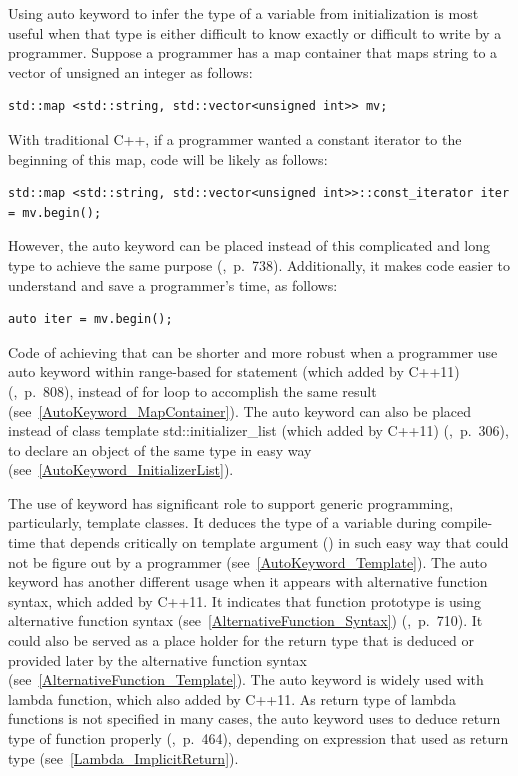 \documentclass[11pt]{report}
\begin{document}
Using auto keyword to infer the type of a variable from initialization is most useful when that type is either difficult to know exactly or difficult to write by a programmer. Suppose a programmer has a map container that maps string to a vector of unsigned an integer as follows: 

\begin{lstlisting}
std::map <std::string, std::vector<unsigned int>> mv;
\end{lstlisting}

With traditional C++, if a programmer wanted a constant iterator to the beginning of this map, code will be likely as follows:

\begin{lstlisting}
std::map <std::string, std::vector<unsigned int>>::const_iterator iter = mv.begin();
\end{lstlisting}

However, the auto keyword can be placed instead of this complicated and long type to achieve the same purpose (\cite{Gregorie:professionalcpp},~p.~738). Additionally, it makes code easier to understand and save a programmer's time, as follows:

\begin{lstlisting}
auto iter = mv.begin();
\end{lstlisting}

Code of achieving that can be shorter and more robust when a programmer use auto keyword within range-based for statement (which added by C++11) (\cite{Horstmann:2008:BC},~p.~808), instead of for loop to accomplish the same result (see~\ref{AutoKeyword_MapContainer}). The auto keyword can also be placed instead of class template std::initializer\_list (which added by C++11) (\cite{Gregorie:professionalcpp},~p.~306), to declare an object of the same type in easy way (see~\ref{AutoKeyword_InitializerList}).

The use of keyword has significant role to support generic programming, particularly, template classes. It deduces the type of a variable  during compile-time that depends critically on template argument (\cite{Stroustrup:2012:Cpp11}) in such easy way that could not be figure out by a programmer (see~\ref{AutoKeyword_Template}). The auto keyword has another different usage when it appears with alternative function syntax, which added by C++11. It indicates that function prototype is using alternative function syntax (see~\ref{AlternativeFunction_Syntax}) (\cite{Gregorie:professionalcpp},~p.~710). It could also be served as a place holder for the return type that is deduced or provided later by the alternative function syntax (see~\ref{AlternativeFunction_Template}). The auto keyword is widely used with lambda function, which also added by C++11. As return type of lambda functions is not specified in many cases, the auto keyword uses to deduce return type of function properly (\cite{Gregorie:professionalcpp},~p.~464), depending on expression that used as return type (see~\ref{Lambda_ImplicitReturn}).
\end{document}

